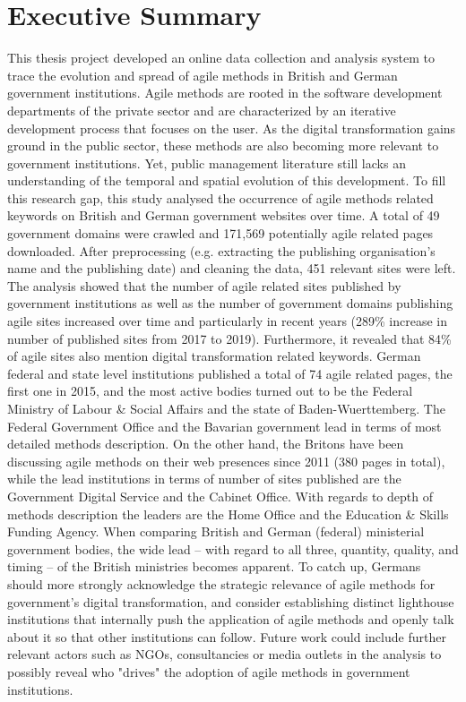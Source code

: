 

\section*{Executive Summary}


This thesis project developed an online data collection and analysis system to trace the evolution and spread of agile methods in British and German government institutions. Agile methods are rooted in the software development departments of the private sector and are characterized by an iterative development process that focuses on the user. As the digital transformation gains ground in the public sector, these methods are also becoming more relevant to government institutions. Yet, public management literature still lacks an understanding of the temporal and spatial evolution of this development. To fill this research gap, this study analysed the occurrence of agile methods related keywords on British and German government websites over time. A total of 49 government domains were crawled and 171,569 potentially agile related pages downloaded. After preprocessing (e.g. extracting the publishing organisation's name and the publishing date) and cleaning the data, 451 relevant sites were left. The analysis showed that the number of agile related sites published by government institutions as well as the number of government domains publishing agile sites increased over time and particularly in recent years (289\% increase in number of published sites from 2017 to 2019). Furthermore, it revealed that 84\% of agile sites also mention digital transformation related keywords. German federal and state level institutions published a total of 74 agile related pages, the first one in 2015, and the most active bodies turned out to be the Federal Ministry of Labour \& Social Affairs and the state of Baden-Wuerttemberg. The Federal Government Office and the Bavarian government lead in terms of most detailed methods description. On the other hand, the Britons have been discussing agile methods on their web presences since 2011 (380 pages in total), while the lead institutions in terms of number of sites published are the Government Digital Service and the Cabinet Office. With regards to depth of methods description the leaders are the Home Office and the Education \& Skills Funding Agency. When comparing British and German (federal) ministerial government bodies, the wide lead – with regard to all three, quantity, quality, and timing – of the British ministries becomes apparent. To catch up, Germans should more strongly acknowledge the strategic relevance of agile methods for government's digital transformation, and consider establishing distinct lighthouse institutions that internally push the application of agile methods and openly talk about it so that other institutions can follow. Future work could include further relevant actors such as NGOs, consultancies or media outlets in the analysis to possibly reveal who "drives" the adoption of agile methods in government institutions.